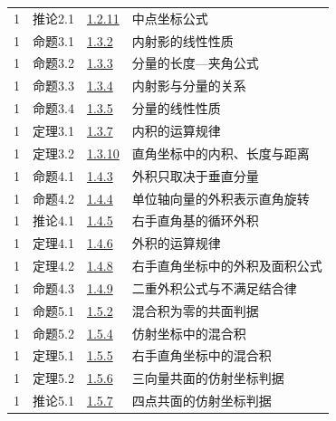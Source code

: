 \documentclass[11pt,a4paper]{article}
\begin{document}
\begin{longtable}{@{}cllp{65mm}@{}}
1&推论2.1&\hyperref[entry:1.2.11]{1.2.11}&中点坐标公式\\

1&命题3.1&\hyperref[entry:1.3.2]{1.3.2}&内射影的线性性质\\

1&命题3.2&\hyperref[entry:1.3.3]{1.3.3}&分量的长度—夹角公式\\

1&命题3.3&\hyperref[entry:1.3.4]{1.3.4}&内射影与分量的关系\\

1&命题3.4&\hyperref[entry:1.3.5]{1.3.5}&分量的线性性质\\

1&定理3.1&\hyperref[entry:1.3.7]{1.3.7}&内积的运算规律\\

1&定理3.2&\hyperref[entry:1.3.10]{1.3.10}&直角坐标中的内积、长度与距离\\

1&命题4.1&\hyperref[entry:1.4.3]{1.4.3}&外积只取决于垂直分量\\

1&命题4.2&\hyperref[entry:1.4.4]{1.4.4}&单位轴向量的外积表示直角旋转\\

1&推论4.1&\hyperref[entry:1.4.5]{1.4.5}&右手直角基的循环外积\\

1&定理4.1&\hyperref[entry:1.4.6]{1.4.6}&外积的运算规律\\

1&定理4.2&\hyperref[entry:1.4.8]{1.4.8}&右手直角坐标中的外积及面积公式\\

1&命题4.3&\hyperref[entry:1.4.9]{1.4.9}&二重外积公式与不满足结合律\\

1&命题5.1&\hyperref[entry:1.5.2]{1.5.2}&混合积为零的共面判据\\

1&命题5.2&\hyperref[entry:1.5.4]{1.5.4}&仿射坐标中的混合积\\

1&定理5.1&\hyperref[entry:1.5.5]{1.5.5}&右手直角坐标中的混合积\\

1&定理5.2&\hyperref[entry:1.5.6]{1.5.6}&三向量共面的仿射坐标判据\\

1&推论5.1&\hyperref[entry:1.5.7]{1.5.7}&四点共面的仿射坐标判据\\


\end{longtable}
\end{document}
